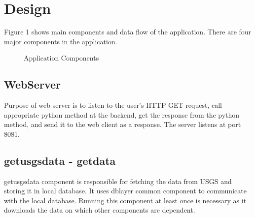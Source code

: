 \documentclass[9pt,twocolumn,twoside]{../../styles/osajnl}
\begin{document}
\section{Design}

Figure 1 shows main components and data flow of the application. There are four major components in the application.

\begin{figure}[htbp]
\centering
{}
\caption{Application Components} 
\label{fig:figure4}
\end{figure}

\subsection{WebServer}
Purpose of web server is to listen to the user's HTTP GET request, call appropriate python method at the backend, get the response from the python method, and send it to the web client as a response. The server listens at port 8081.

\subsection{getusgsdata - getdata}
getusgsdata component is responsible for fetching the data from USGS and storing it in local database. It uses dblayer common component to communicate with the local database. Running this component at least once is necessary as it downloads the data on which other components are dependent. 
\end{document}

